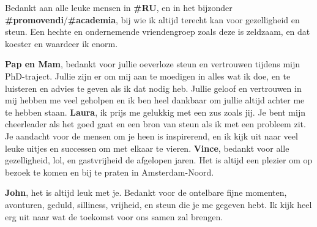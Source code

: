 Bedankt aan alle leuke mensen in \textbf{\#RU}, en in het bijzonder \textbf{\#promovendi}/\textbf{\#academia}, bij wie ik altijd terecht kan voor gezelligheid en steun. Een hechte en ondernemende vriendengroep zoals deze is zeldzaam, en dat koester en waardeer ik enorm.

\textbf{Pap en Mam}, bedankt voor jullie oeverloze steun en vertrouwen tijdens mijn PhD-traject. Jullie zijn er om mij aan te moedigen in alles wat ik doe, en te luisteren en advies te geven als ik dat nodig heb. Jullie geloof en vertrouwen in mij hebben me veel geholpen en ik ben heel dankbaar om jullie altijd achter me te hebben staan. 
\textbf{Laura}, ik prijs me gelukkig met een zus zoals jij. Je bent mijn cheerleader als het goed gaat en een bron van steun als ik met een probleem zit. Je aandacht voor de mensen om je heen is inspirerend, en ik kijk uit naar veel leuke uitjes en successen om met elkaar te vieren. \textbf{Vince}, bedankt voor alle gezelligheid, lol, en gastvrijheid de afgelopen jaren. Het is altijd een plezier om op bezoek te komen en bij te praten in Amsterdam-Noord. 

\textbf{John}, het is altijd leuk met je. Bedankt voor de ontelbare fijne momenten, avonturen, geduld, silliness, vrijheid, en steun die je me gegeven hebt. Ik kijk heel erg uit naar wat de toekomst voor ons samen zal brengen.  